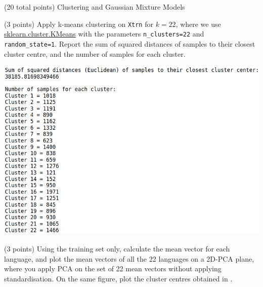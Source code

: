 \documentclass[12pt]{article}
\begin{document}
\clearpage
%
%

\begin{question}{(20 total points) Clustering and Gaussian Mixture Models}  


  


  \medskip
   \begin{subquestion}{(3 points)
       Apply k-means clustering on {\tt Xtrn} for $k = 22$, where we use
       \href{https://scikit-learn.org/0.19/modules/generated/sklearn.cluster.KMeans.html}{sklearn.cluster.KMeans}
       with the parameters {\tt n\_clusters=22} and {\tt random\_state=1}.
       Report the sum of squared distances of samples to their closest
       cluster centre, and the number of samples for each cluster.
     } \label{Q3.1}
   

      \begin{answerbox}{35em}
         \includegraphics[width=1\textwidth]{images/q31.png}
      \end{answerbox}
  


   \end{subquestion}
   \begin{subquestion}{(3 points)
       Using the training set only,
       calculate the mean vector for each language, and plot the mean
       vectors of all the 22 languages on a 2D-PCA plane, where you
       apply PCA on the set of 22 mean vectors without applying
       standardisation.  
       On the same figure, plot the cluster centres obtained in .
     } \label{Q3.2}


\end{subquestion}
\end{question}
\end{document}
